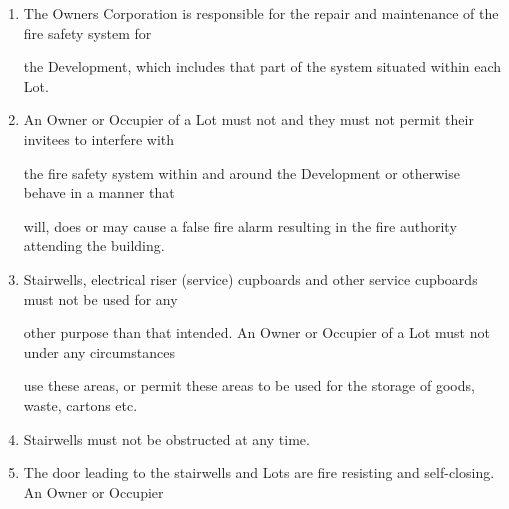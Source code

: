 \documentclass{article}
\begin{document}
\begin{enumerate}[label=\arabic*.]
\begin{enumerate}[label=\arabic{enumi}.\arabic*.]
\begin{enumerate}[label=(\arabic*)]
\begin{enumerate}[label=(\alph*)]
{\fontsize{10.02}{1}Property not required for access to a Lot; }

{\fontsize{9.962}{1}(ii) allowing part of the Common Property to be used for security purposes including monitoring }

{\fontsize{10.02}{1}security and safety of Lots, even if this means excluding Owners or Occupiers from using that }

{\fontsize{10.02}{1}part of the Common Property; and }

{\fontsize{9.962}{1}(iii) restrict by means of key or other security device the access of the Owners or Occupiers of one }

{\fontsize{10.02}{1}level of the Building any other level of the Building. }

\item {\fontsize{9.962}{1} The Owners Corporation is responsible for the repair and maintenance of the fire safety system for }

{\fontsize{10.02}{1}the Development, which includes that part of the system situated within each Lot. }

\item {\fontsize{9.962}{1} An Owner or Occupier of a Lot must not and they must not permit their invitees to interfere with }

{\fontsize{10.02}{1}the fire safety system within and around the Development or otherwise behave in a manner that }

{\fontsize{10.02}{1}will, does or may cause a false fire alarm resulting in the fire authority attending the building. }

\newpage

\item {\fontsize{9.962}{1} Stairwells, electrical riser (service) cupboards and other service cupboards must not be used for any }

{\fontsize{10.02}{1}other purpose than that intended. An Owner or Occupier of a Lot must not under any circumstances }

{\fontsize{10.02}{1}use these areas, or permit these areas to be used for the storage of goods, waste, cartons etc. }

\item {\fontsize{9.962}{1} Stairwells must not be obstructed at any time. }

\item {\fontsize{9.962}{1} The door leading to the stairwells and Lots are fire resisting and self-closing. An Owner or Occupier }


\end{enumerate}
\end{enumerate}
\end{enumerate}
\end{enumerate}
\end{document}
